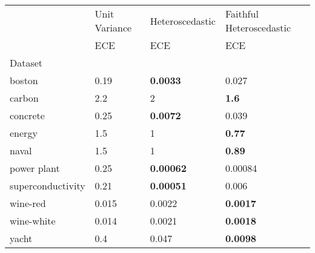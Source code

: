 \begin{tabular}{l|l|l|l}
\toprule
 & Unit Variance & Heteroscedastic & Faithful Heteroscedastic \\
 & ECE & ECE & ECE \\
Dataset &  &  &  \\
\midrule
boston & 0.19 & \bfseries 0.0033 & 0.027 \\
carbon & 2.2 & 2 & \bfseries 1.6 \\
concrete & 0.25 & \bfseries 0.0072 & 0.039 \\
energy & 1.5 & 1 & \bfseries 0.77 \\
naval & 1.5 & 1 & \bfseries 0.89 \\
power plant & 0.25 & \bfseries 0.00062 & 0.00084 \\
superconductivity & 0.21 & \bfseries 0.00051 & 0.006 \\
wine-red & 0.015 & 0.0022 & \bfseries 0.0017 \\
wine-white & 0.014 & 0.0021 & \bfseries 0.0018 \\
yacht & 0.4 & 0.047 & \bfseries 0.0098 \\
\bottomrule
\end{tabular}
